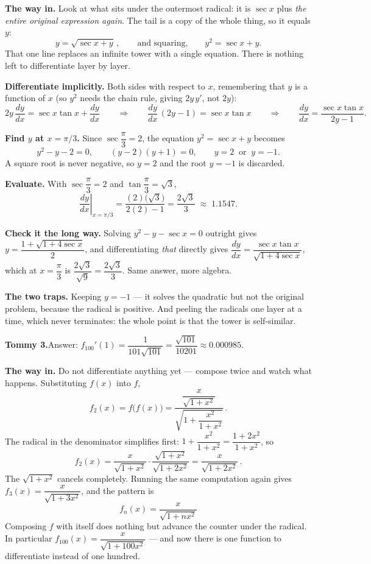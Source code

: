 \documentclass[11pt]{article}
\begin{document}
\medskip
\noindent\textbf{The way in.} Look at what sits under the outermost radical: it is
$\sec x$ plus \emph{the entire original expression again}. The tail is a copy of the whole
thing, so it equals $y$:
\[
  y=\sqrt{\sec x+y}\,,\qquad\text{and squaring,}\qquad y^{2}=\sec x+y .
\]
That one line replaces an infinite tower with a single equation. There is nothing left to
differentiate layer by layer.

\medskip
\noindent\textbf{Differentiate implicitly.} Both sides with respect to $x$, remembering that
$y$ is a function of $x$ (so $y^{2}$ needs the chain rule, giving $2y\,y'$, not $2y$):
\[
  2y\,\frac{dy}{dx}=\sec x\tan x+\frac{dy}{dx}
  \qquad\Longrightarrow\qquad
  \frac{dy}{dx}\,(2y-1)=\sec x\tan x
  \qquad\Longrightarrow\qquad
  \frac{dy}{dx}=\frac{\sec x\tan x}{2y-1}.
\]

\medskip
\noindent\textbf{Find $y$ at $x=\pi/3$.} Since $\sec\dfrac{\pi}{3}=2$, the equation
$y^{2}=\sec x+y$ becomes
\[
  y^{2}-y-2=0,\qquad (y-2)(y+1)=0,\qquad y=2\ \text{ or }\ y=-1 .
\]
A square root is never negative, so $y=2$ and the root $y=-1$ is discarded.

\medskip
\noindent\textbf{Evaluate.} With $\sec\dfrac{\pi}{3}=2$ and $\tan\dfrac{\pi}{3}=\sqrt{3}$,
\[
  \left.\frac{dy}{dx}\right|_{x=\pi/3}
  =\frac{(2)\bigl(\sqrt{3}\bigr)}{2(2)-1}
  =\frac{2\sqrt{3}}{3}\;\approx\;1.1547 .
\]

\medskip
\noindent\textbf{Check it the long way.} Solving $y^{2}-y-\sec x=0$ outright gives
$y=\dfrac{1+\sqrt{1+4\sec x}}{2}$, and differentiating \emph{that} directly gives
$\dfrac{dy}{dx}=\dfrac{\sec x\tan x}{\sqrt{1+4\sec x}}$, which at $x=\dfrac{\pi}{3}$ is
$\dfrac{2\sqrt{3}}{\sqrt{9}}=\dfrac{2\sqrt{3}}{3}$. Same answer, more algebra.

\medskip
\noindent\textbf{The two traps.} Keeping $y=-1$ --- it solves the quadratic but not the
original problem, because the radical is positive. And peeling the radicals one layer at a
time, which never terminates: the whole point is that the tower is self-similar.

\bigskip
\noindent\textbf{Tommy 3.}\quad Answer:
$f_{100}'(1)=\dfrac{1}{101\sqrt{101}}=\dfrac{\sqrt{101}}{10201}\approx 0.000985$.

\medskip
\noindent\textbf{The way in.} Do not differentiate anything yet --- compose twice and watch
what happens. Substituting $f(x)$ into $f$,
\[
  f_{2}(x)=f\bigl(f(x)\bigr)
  =\frac{\dfrac{x}{\sqrt{1+x^{2}}}}{\sqrt{1+\dfrac{x^{2}}{1+x^{2}}}}\,.
\]
The radical in the denominator simplifies first:
$1+\dfrac{x^{2}}{1+x^{2}}=\dfrac{1+2x^{2}}{1+x^{2}}$, so
\[
  f_{2}(x)=\frac{x}{\sqrt{1+x^{2}}}\cdot\frac{\sqrt{1+x^{2}}}{\sqrt{1+2x^{2}}}
          =\frac{x}{\sqrt{1+2x^{2}}}\,.
\]
The $\sqrt{1+x^{2}}$ cancels completely. Running the same computation again gives
$f_{3}(x)=\dfrac{x}{\sqrt{1+3x^{2}}}$, and the pattern is
\[
  \boxed{\,f_{n}(x)=\frac{x}{\sqrt{1+nx^{2}}}\,}
\]
Composing $f$ with itself does nothing but advance the counter under the radical. In
particular $f_{100}(x)=\dfrac{x}{\sqrt{1+100x^{2}}}$ --- and now there is one function to
differentiate instead of one hundred.
\end{document}
